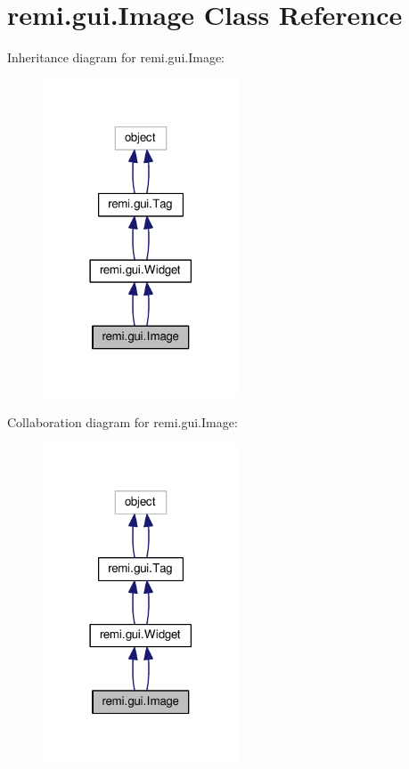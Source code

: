 \hypertarget{classremi_1_1gui_1_1Image}{}\section{remi.\+gui.\+Image Class Reference}
\label{classremi_1_1gui_1_1Image}


Inheritance diagram for remi.\+gui.\+Image\+:
\nopagebreak
\begin{figure}[H]
\begin{center}
\leavevmode
\includegraphics[width=165pt]{d4/dbd/classremi_1_1gui_1_1Image__inherit__graph}
\end{center}
\end{figure}


Collaboration diagram for remi.\+gui.\+Image\+:
\nopagebreak
\begin{figure}[H]
\begin{center}
\leavevmode
\includegraphics[width=165pt]{d6/d7b/classremi_1_1gui_1_1Image__coll__graph}
\end{center}
\end{figure}
